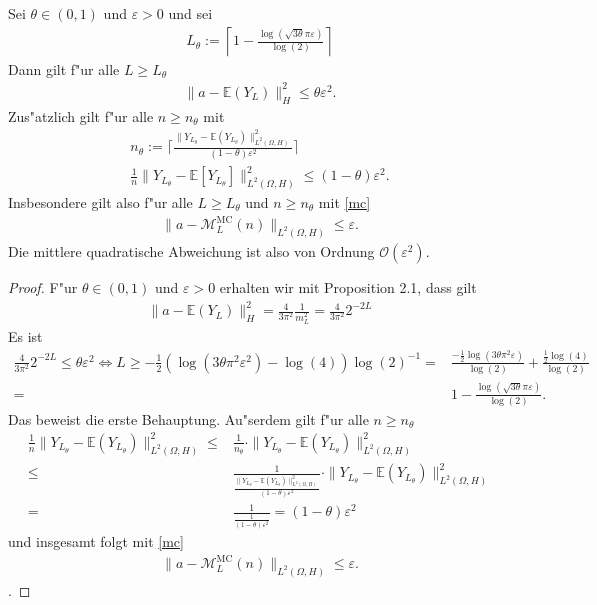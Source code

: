 \begin{prop}
Sei $\theta\in(0,1)$ und $\varepsilon>0$ und sei
\begin{align*}
L_\theta:=\left\lceil 1- \frac{\log(\sqrt{3\theta}\pi\varepsilon)}{\log(2)}\right\rceil
\end{align*}
Dann gilt f"ur alle $L\geq L_\theta$
\begin{align*}
\|a-\mathbb{E}(Y_L)\|^2_H\leq \theta\varepsilon^2.
\end{align*}
Zus"atzlich gilt f"ur alle $n \geq n_\theta$ mit
\begin{align*}
n_\theta:=\Big\lceil\frac{\|Y_{L_\theta}-\mathbb{E}(Y_{L_\theta})\|^2_{L^2(\Omega,H)}}{(1-\theta)\varepsilon^2}\Big\rceil \\
\frac{1}{n}\|Y_{L_\theta}-\mathbb{E}[Y_{L_\theta}]\|^2_{L^2(\Omega,H)}\leq (1-\theta)\varepsilon^2.
\end{align*}
Insbesondere gilt also f"ur alle $L\geq L_\theta$ und $n\geq n_\theta$ mit \eqref{mc}
\begin{align*}
\|a-\mathcal{M}_L^{\text{MC}}(n)\|_{L^2(\Omega,H)}\leq \varepsilon.
\end{align*}
Die mittlere quadratische Abweichung ist also von Ordnung $\mathcal{O}(\varepsilon^2)$.
\end{prop}
\begin{proof}
F"ur $\theta\in(0,1)$ und $\varepsilon>0$ erhalten wir mit Proposition 2.1, dass gilt
\begin{align*}
\|a-\mathbb{E}(Y_L)\|^2_H=\frac{4}{3\pi^2}\frac{1}{m^2_L}=\frac{4}{3\pi^2}2^{-2L}
\end{align*}
Es ist 
\begin{align*}
\frac{4}{3\pi^2}2^{-2L}\leq \theta \varepsilon^2 \Leftrightarrow L \geq -\frac{1}{2}(\log(3\theta\pi^2\varepsilon^2)-\log(4))\log(2)^{-1}=&\frac{-\frac{1}{2}\log(3\theta\pi^2\varepsilon)}{\log(2)}+\frac{\frac{1}{2}\log(4)}{\log(2)}
\\=&1-\frac{\log(\sqrt{3\theta}\pi\varepsilon)}{\log(2)}.
\end{align*}
Das beweist die erste Behauptung. Au"serdem gilt f"ur alle $n\geq n_\theta$
\begin{align*}
\frac{1}{n}\|Y_{L_\theta}-\mathbb{E}(Y_{L_\theta})\|^2_{L^2(\Omega,H)}\leq& \frac{1}{n_\theta}\cdot \|Y_{L_\theta}-\mathbb{E}(Y_{L_\theta})\|^2_{L^2(\Omega,H)}\\ \leq&\frac{1}{\frac{\|Y_{L_\theta}-\mathbb{E}(Y_{L_\theta})\|^2_{L^2(\Omega,H)}}{(1-\theta)\varepsilon^2}}\cdot \|Y_{L_\theta}-\mathbb{E}(Y_{L_\theta})\|^2_{L^2(\Omega,H)}\\=&\frac{1}{\frac{1}{(1-\theta)\varepsilon^2}}=(1-\theta)\varepsilon^2
\end{align*}
und insgesamt folgt mit \eqref{mc} 
\begin{align*}
\|a-\mathcal{M}_L^{\text{MC}}(n)\|_{L^2(\Omega,H)}\leq \varepsilon.
\end{align*}.
\end{proof} 
